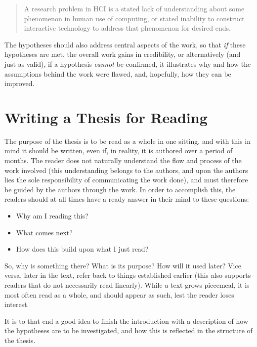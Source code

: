 \begin{quote}
  A research problem in HCI is a stated lack of understanding about some
  phenomenon in human use of computing, or stated inability to construct
  interactive technology to address that phenomenon for desired
  ends.~\cite[Def.\ 1]{Oulasvirta2016:POT2CCOHFICS2016}
\end{quote}


The hypotheses should also address central aspects of the work, so that
\emph{if} these hypotheses are met, the overall work gains in credibility,
or alternatively (and just as valid), if a hypothesis \emph{cannot} be
confirmed, it illustrates why and how the assumptions behind the work were
flawed, and, hopefully, how they can be improved.


\section{Writing a Thesis for Reading}
\label{sec:writ-thes-read}

The purpose of the thesis is to be read as a whole in one sitting, and with
this in mind it should be written, even if, in reality, it is authored over
a period of months.  The reader does not naturally understand the flow and
process of the work involved (this understanding belongs to the authors, and
upon the authors lies the sole responsibility of communicating the work
done), and must therefore be guided by the authors through the work.  In
order to accomplish this, the readers should at all times have a ready
answer in their mind to these questions:

\begin{itemize}
\item Why am I reading this?
\item What comes next?
\item How does this build upon what I just read?
\end{itemize}

So, why is something there? What is its purpose? How will it used later?
Vice versa, later in the text, refer back to things established earlier
(this also supports readers that do not necessarily read linearly). While a
text grows piecemeal, it is most often read as a whole, and should appear as
such, lest the reader loses interest.

It is to that end a good idea to finish the introduction with a description
of how the hypotheses are to be investigated, and how this is reflected in
the structure of the thesis.

